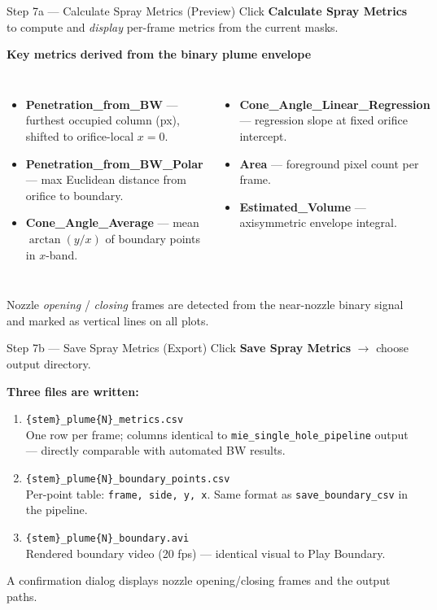 \documentclass[aspectratio=169,10pt]{beamer}
\begin{document}
\begin{frame}{Step 7a — Calculate Spray Metrics (Preview)}
  Click \textbf{Calculate Spray Metrics} to compute and \emph{display} per-frame metrics from the current masks.

  \medskip
  \textbf{Key metrics derived from the binary plume envelope}
  \begin{columns}
      \begin{itemize}
        \item \textbf{Penetration\_from\_BW} — furthest occupied column (px), shifted to orifice-local $x=0$.
        \item \textbf{Penetration\_from\_BW\_Polar} — max Euclidean distance from orifice to boundary.
        \item \textbf{Cone\_Angle\_Average} — mean $\arctan(y/x)$ of boundary points in $x$-band.
      \end{itemize}
      \begin{itemize}
        \item \textbf{Cone\_Angle\_Linear\_Regression} — regression slope at fixed orifice intercept.
        \item \textbf{Area} — foreground pixel count per frame.
        \item \textbf{Estimated\_Volume} — axisymmetric envelope integral.
      \end{itemize}
  \end{columns}

  \medskip
  Nozzle \emph{opening} / \emph{closing} frames are detected from the near-nozzle binary signal and marked as vertical lines on all plots.
\end{frame}

\begin{frame}{Step 7b — Save Spray Metrics (Export)}
  Click \textbf{Save Spray Metrics} $\to$ choose output directory.

  \medskip
  \textbf{Three files are written:}
  \begin{enumerate}
    \item \texttt{\{stem\}\_plume\{N\}\_metrics.csv}\\
          One row per frame; columns identical to \texttt{mie\_single\_hole\_pipeline} output — directly comparable with automated BW results.
    \item \texttt{\{stem\}\_plume\{N\}\_boundary\_points.csv}\\
          Per-point table: \texttt{frame, side, y, x}. Same format as \texttt{save\_boundary\_csv} in the pipeline.
    \item \texttt{\{stem\}\_plume\{N\}\_boundary.avi}\\
          Rendered boundary video (20 fps) — identical visual to Play Boundary.
  \end{enumerate}

  \medskip
  A confirmation dialog displays nozzle opening/closing frames and the output paths.
\end{frame}
\end{document}
